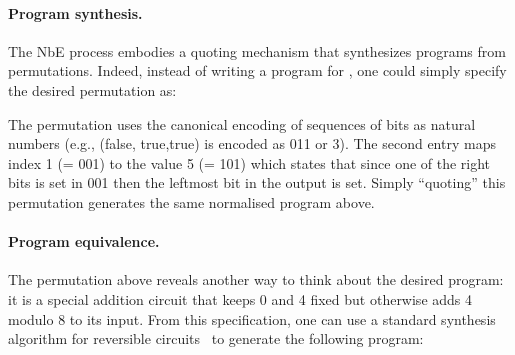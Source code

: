 

\paragraph*{Program synthesis.} The NbE process embodies a quoting mechanism that synthesizes programs from
permutations. Indeed, instead of writing a program for , one could simply specify the desired permutation
as:

\resetperm{}

\noindent The permutation uses the canonical encoding of sequences of bits as natural numbers (e.g., (\textsf{false},
\textsf{true},\textsf{true}) is encoded as 011 or 3).  The second entry maps index 1 (= 001) to the value 5 (= 101)
which states that since one of the right bits is set in 001 then the leftmost bit in the output is set. Simply
``quoting'' this permutation generates the same normalised program  above.

\paragraph*{Program equivalence.} The permutation above reveals another way to think about the desired program: it is a
special addition circuit that keeps 0 and 4 fixed but otherwise adds 4 modulo 8 to its input. From this specification,
one can use a standard synthesis algorithm for reversible circuits~\cite{10.1145/775832.775915} to generate the
following program:

